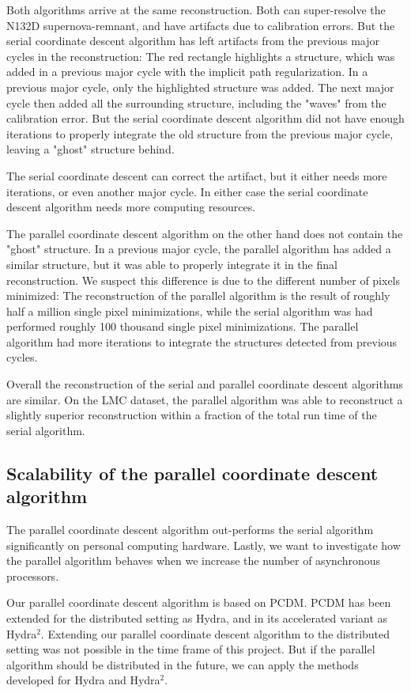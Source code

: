 Both algorithms arrive at the same reconstruction. Both can super-resolve the N132D supernova-remnant, and have artifacts due to calibration errors. But the serial coordinate descent algorithm has left artifacts from the previous major cycles in the reconstruction: The red rectangle highlights a structure, which was added in a previous major cycle with the implicit path regularization. In a previous major cycle, only the highlighted structure was added. The next major cycle then added all the surrounding structure, including the "waves" from the calibration error. But the serial coordinate descent algorithm did not have enough iterations to properly integrate the old structure from the previous major cycle, leaving a "ghost" structure behind.

The serial coordinate descent can correct the artifact, but it either needs more iterations, or even another major cycle. In either case the serial coordinate descent algorithm needs more computing resources.

The parallel coordinate descent algorithm on the other hand does not contain the "ghost" structure. In a previous major cycle, the parallel algorithm has added a similar structure, but it was able to properly integrate it in the final reconstruction. We suspect this difference is due to the different number of pixels minimized: The reconstruction of the parallel algorithm is the result of roughly half a million single pixel minimizations, while the serial algorithm was had performed roughly 100 thousand single pixel minimizations. The parallel algorithm had more iterations to integrate the structures detected from previous cycles.

Overall the reconstruction of the serial and parallel coordinate descent algorithms are similar. On the LMC dataset, the parallel algorithm was able to reconstruct a slightly superior reconstruction within a fraction of the total run time of the serial algorithm.


\subsection{Scalability of the parallel coordinate descent algorithm}\label{pcdm:scale}
The parallel coordinate descent algorithm out-performs the serial algorithm significantly on personal computing hardware. Lastly, we want to investigate how the parallel algorithm behaves when we increase the number of asynchronous processors.

Our parallel coordinate descent algorithm is based on PCDM\cite{richtarik2016parallel}. PCDM has been extended for the distributed setting as Hydra\cite{richtarik2016distributed}, and in its accelerated variant as Hydra$^2$\cite{fercoq2014fast}. Extending our parallel coordinate descent algorithm to the distributed setting was not possible in the time frame of this project. But if the parallel algorithm should be distributed in the future, we can apply the methods developed for Hydra and Hydra$^2$.


